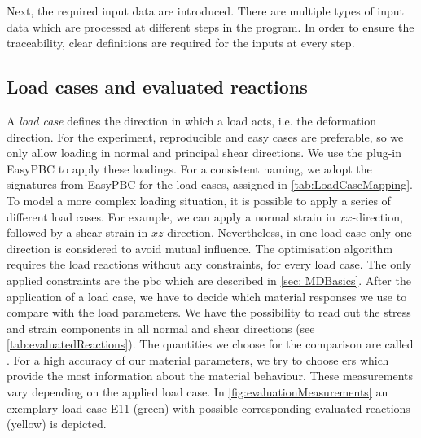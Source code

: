 Next, the required input data are introduced. There are multiple types of input data which are processed at different steps in the program. In order to ensure the traceability, clear definitions are required for the inputs at every step. 

\subsection{Load cases and evaluated reactions}\label{subsec: loadCases}

A \emph{load case} defines the direction in which a load acts, i.e. the deformation direction.
For the experiment, reproducible and easy cases are preferable, so we only allow loading in normal and principal shear directions. We use the  plug-in EasyPBC to apply these loadings. For a consistent naming, we adopt the signatures from EasyPBC for the load cases, assigned in \autoref{tab:LoadCaseMapping}.
To model a more complex loading situation, it is possible to apply a series of different load cases.
For example, we can apply a normal strain in $xx$-direction, followed by a shear strain in $xz$-direction.
Nevertheless, in one load case only one direction is considered to avoid mutual influence. The optimisation algorithm requires the load reactions without any constraints, for every load case.
The only applied constraints are the \acrshort{pbc} which are described in \autoref{sec: MDBasics}. After the application of a load case, we have to decide which material responses we use to compare with the load parameters. We have the possibility to read out the stress and strain components in all normal and shear directions (see \autoref{tab:evaluatedReactions}). The quantities we choose for the comparison are called .
For a high accuracy of our material parameters, we try to choose \acrlong{er}s which provide the most information about the material behaviour. These measurements vary depending on the applied load case. In \autoref{fig:evaluationMeasurements} an exemplary load case E11 (green) with possible corresponding evaluated reactions (yellow) is depicted.

